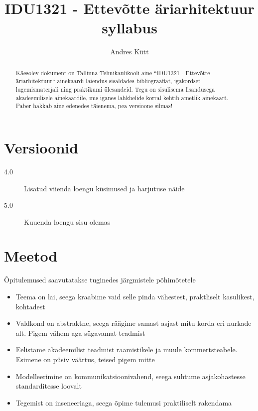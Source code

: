 \documentclass[nobib]{tufte-handout}
\title{IDU1321 - Ettevõtte äriarhitektuur syllabus}
\author[Andres Kütt]{Andres Kütt}
\begin{document}
\maketitle
\begin{abstract}
\noindent
Käesolev dokument on Tallinna Tehnikaülikooli aine ``IDU1321 - Ettevõtte äriarhitektuur`` ainekaardi laiendus sisaldades bibliograafiat, igakordset lugemismaterjali ning praktikumi ülesandeid. Tegu on sisulisema lisandusega akadeemilisele ainekaardile, mis iganes lahkhelide korral kehtib ametlik ainekaart. Paber hakkab aine edenedes täienema, pea versioone silmas!
\end{abstract}

\section{Versioonid}
\begin{description}
	\item[4.0] Lisatud viienda loengu küsimused ja harjutuse näide
	\item[5.0] Kuuenda loengu sisu olemas
\end{description}

\section{Meetod}
Õpitulemused saavutatakse tuginedes järgmistele põhimõtetele
\begin{itemize}
	\item Teema on lai, seega kraabime vaid selle pinda vähestest, praktliselt kasulikest, kohtadest
	\item Valdkond on abstraktne, seega räägime samast asjast mitu korda eri nurkade alt. Pigem vähem aga sügavamat teadmist
	\item Eelistame akadeemilist teadmist raamistikele ja muule kommertsteabele. Esimene on püsiv väärtus, teised pigem mitte
	\item Modelleerimine on kommunikatsioonivahend, seega suhtume asjakohastesse standarditesse loovalt
	\item Tegemist on inseneeriaga, seega õpime tulemusi praktiliselt rakendama
\end{itemize}
\end{document}
